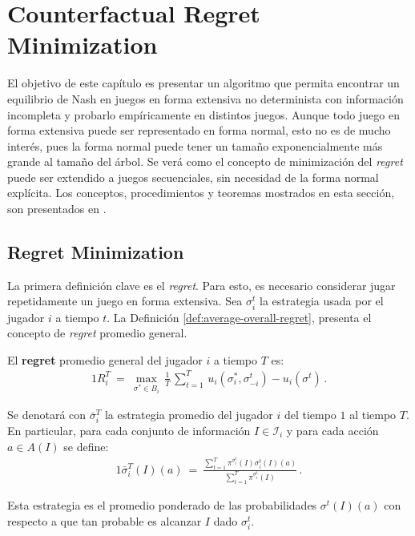 \chapter{Counterfactual Regret Minimization}
\label{chapter:cfr}

El objetivo de este capítulo es presentar un algoritmo que permita encontrar un equilibrio de Nash en juegos en forma extensiva no determinista con información incompleta y probarlo empíricamente en distintos juegos. Aunque todo juego en forma extensiva puede ser representado en forma normal, esto no es de mucho interés, pues la forma normal puede tener un tamaño exponencialmente más grande al tamaño del árbol. Se verá como el concepto de minimización del \textit{regret} puede ser extendido a juegos secuenciales, sin necesidad de la forma normal explícita. Los conceptos, procedimientos y teoremas mostrados en esta sección, son presentados en \cite{bib:cfr}.

\section{Regret Minimization}

La primera definición clave es el \textit{regret}. Para esto, es necesario considerar jugar repetidamente un juego en forma extensiva. Sea $\sigma_i^t$ la estrategia usada por el jugador $i$ a tiempo $t$. La Definición \ref{def:average-overall-regret}, presenta el concepto de \textit{regret} promedio general.

\begin{definition}
\label{def:average-overall-regret}
El \textbf{regret} promedio general del jugador $i$ a tiempo $T$ es:
\begin{alignat}{1}
R_i^T\ =\ \max_{\sigma^* \in B_i} \, \frac{1}{T}\, \sum_{t = 1}^T \, u_i(\sigma_i^*, \sigma_{-i}^t) - u_i(\sigma^t) \,.
\end{alignat}
\end{definition}

Se denotará con $\bar{\sigma}_i^{T}$ la estrategia promedio del jugador $i$ del tiempo $1$ al tiempo $T$. En particular, para cada conjunto de información $I \in \mathcal{I}_i$ y para cada acción $a \in A(I)$ se define:
\begin{alignat}{1}
\bar{\sigma}_i^{T}(I)(a)\ =\ \frac{\sum_{t = 1}^T \pi^{\sigma^t_i}(I)\sigma^t_i(I)(a)}{\sum_{t = 1}^T \pi^{\sigma_i^t}(I)} \,.
\end{alignat}

Esta estrategia es el promedio ponderado de las probabilidades $\sigma^t(I)(a)$ con respecto a que tan probable es alcanzar $I$ dado $\sigma_i^t$.

